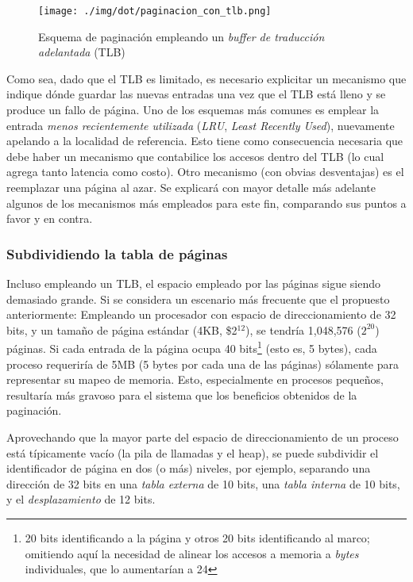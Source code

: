 \documentclass[11pt,fleqn]{book} %
\begin{document}
\begin{figure}[htb]
\centering
\texttt{[image: ./img/dot/paginacion\_con\_tlb.png]}
\caption{\label{MEM_paginacion_con_tlb}Esquema de paginación empleando un \emph{buffer de traducción adelantada} (TLB)}
\end{figure}

Como sea, dado que el TLB es limitado, es necesario explicitar un
mecanismo que indique dónde guardar las nuevas entradas una vez que el
TLB está lleno y se produce un fallo de página. Uno de los esquemas
más comunes es emplear la entrada \emph{menos recientemente utilizada}
(\emph{LRU}, \emph{Least Recently Used}), nuevamente apelando a la localidad de
referencia. Esto tiene como consecuencia necesaria que debe haber un
mecanismo que contabilice los accesos dentro del TLB (lo cual agrega
tanto latencia como costo). Otro mecanismo (con obvias desventajas) es
el reemplazar una página al azar. Se explicará con mayor detalle más
adelante algunos de los mecanismos más empleados para este fin,
comparando sus puntos a favor y en contra.
\subsubsection{Subdividiendo la tabla de páginas}
\label{sec-5-4-2-2}


Incluso empleando un TLB, el espacio empleado por las páginas sigue
siendo demasiado grande. Si se considera un escenario más frecuente que
el propuesto anteriormente: Empleando un procesador con espacio de
direccionamiento de 32 bits, y un tamaño de página estándar (4KB,
\$2$^{\mathrm{12}}$), se tendría  1,048,576 ($2^{20}$) páginas. Si cada entrada
de la página ocupa 40 bits\footnote{20 bits identificando a la página y
otros 20 bits identificando al marco; omitiendo aquí la necesidad de
alinear los accesos a memoria a \emph{bytes} individuales, que lo
aumentarían a 24 } (esto es, 5 bytes), cada proceso requeriría de 5MB
(5 bytes por cada una de las páginas) sólamente para representar su
mapeo de memoria. Esto, especialmente en procesos pequeños, resultaría
más gravoso para el sistema que los beneficios obtenidos de la
paginación.

Aprovechando que la mayor parte del espacio de direccionamiento de un
proceso está típicamente vacío (la pila de llamadas y el heap),
 se puede subdividir el identificador
de página en dos (o más) niveles, por ejemplo, separando una dirección
de 32 bits en una \emph{tabla externa} de 10 bits, una \emph{tabla interna} de
10 bits, y el \emph{desplazamiento} de 12 bits.
\end{document}
